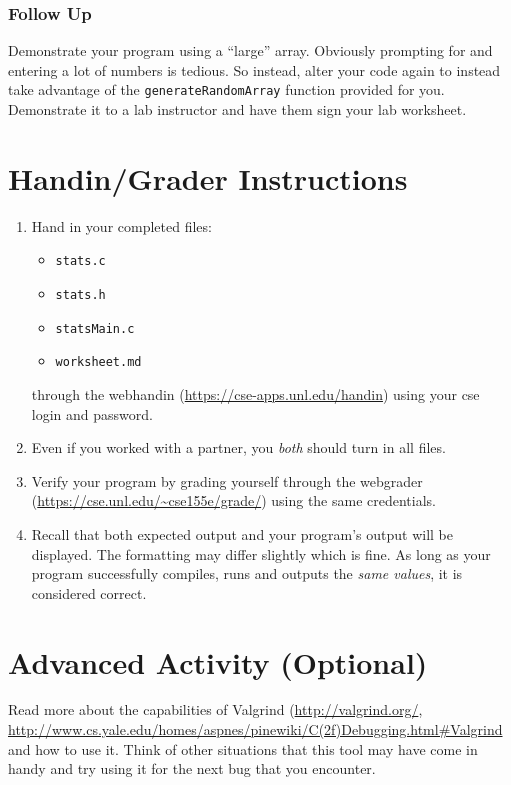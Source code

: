 \documentclass[12pt]{scrartcl}
\begin{document}
\subsubsection*{Follow Up}

Demonstrate your program using a ``large'' array.  Obviously prompting 
for and entering a lot of numbers is tedious.  So instead, alter your code 
again to instead take advantage of the \texttt{generateRandomArray} 
function provided for you.  Demonstrate it to a lab instructor and have 
them sign your lab worksheet. 

\section{Handin/Grader Instructions}

\begin{enumerate}
  \item Hand in your completed files:
  \begin{itemize}
    \item \texttt{stats.c}
    \item \texttt{stats.h}
    \item \texttt{statsMain.c}
    \item \texttt{worksheet.md}
  \end{itemize}
  through the webhandin (\url{https://cse-apps.unl.edu/handin}) 
  using your cse login and password.  
  \item Even if you worked with a partner, you \emph{both} should
  turn in all files.
  \item Verify your program by grading yourself through the
  webgrader (\url{https://cse.unl.edu/~cse155e/grade/}) using the
  same credentials.
  \item Recall that both expected output and your program's output
  will be displayed.  The formatting may differ slightly which is fine.
  As long as your program successfully compiles, runs and outputs 
  the \emph{same values}, it is considered correct.
\end{enumerate}


\section{Advanced Activity (Optional)}

Read more about the capabilities of Valgrind (\url{http://valgrind.org/}, 
\url{http://www.cs.yale.edu/homes/aspnes/pinewiki/C(2f)Debugging.html#Valgrind}
and how to use it.  Think of other situations that this tool may have come in
handy and try using it for the next bug that you encounter.  
\end{document}
